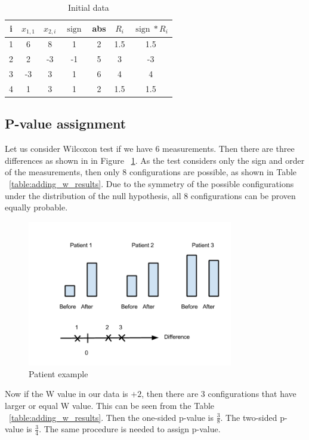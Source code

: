 \documentclass[12pt]{article}
\DeclareMathOperator{\sign}{sign}
\begin{document}
{\begin{table}[h!]
  \begin{center}
    \begin{tabular}{ccccccc}
      \hline
      i & $x_{1, 1}$ & $x_{2, i}$ & $\sign$ & abs & $R_i$ & $\sign * R_i$\\
      \hline
      1 & 6 & 8 & 1 & 2 & 1.5 & 1.5 \\
      \hline
      2 & 2 & -3 & -1 & 5 & 3 & -3 \\
      \hline
      3 & -3 & 3 & 1 & 6 & 4 & 4 \\
      \hline
      4 & 1 & 3 & 1 & 2 & 1.5 & 1.5 \\
      \hline
    \end{tabular}
    \caption{Initial data}
    \label{table:wilx_example}
  \end{center}
\end{table}


\subsection{P-value assignment}
Let us consider Wilcoxon test if we have 6 measurements. Then there are three differences as shown in in Figure ~\ref{fig:patientExample}. As the test considers only the sign and order of the measurements, then only 8 configurations are possible, as shown in Table ~\ref{table:adding_w_results}. Due to the symmetry of the possible configurations under the distribution of the null hypothesis, all 8 configurations can be proven equally probable.
\begin{figure}[h!]
  \centering
  \includegraphics[width=0.8\textwidth]{patientExample}
  \caption{Patient example}
  \label{fig:patientExample}
\end{figure}

Now if the W value in our data is $+2$, then there are 3 configurations that have larger or equal W value. This can be seen from the Table ~\ref{table:adding_w_results}. Then the one-sided p-value is $\frac{3}{8}$. The two-sided p-value is $\frac{3}{4}$. The same procedure is needed to assign p-value.

}
\end{document}
